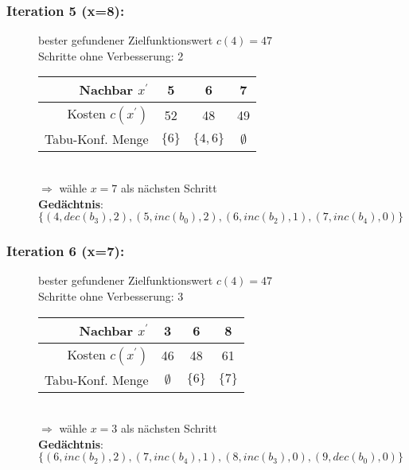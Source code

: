 \documentclass[12pt]{article}
\begin{document}
	\subsubsection*{Iteration 5 (x=8):}
	\begin{figure}[H]
		\centering
		bester gefundener Zielfunktionswert $c(4)=47$\\
		Schritte ohne Verbesserung: 2\\
		\begin{tabular}{r | ccc}
			Nachbar $x^\prime$   & 5 & 6 & 7\\\hline
			Kosten $c(x^\prime)$ & 52 & 48 & 49\\\hline
			Tabu-Konf. Menge     & $\{6\}$ & $\{4,6\}$ & $\emptyset$ \\
		\end{tabular}\\
		$\Rightarrow $ wähle $x=7$ als nächsten Schritt\\
		\textbf{Gedächtnis}: $\{(4, dec(b_3),2), (5, inc(b_0),2), (6, inc(b_2),1), (7,inc(b_4),0)\}$
	\end{figure}
	
	\subsubsection*{Iteration 6 (x=7):}
	\begin{figure}[H]
		\centering
		bester gefundener Zielfunktionswert $c(4)=47$\\
		Schritte ohne Verbesserung: 3\\
		\begin{tabular}{r | ccc}
			Nachbar $x^\prime$   & 3 & 6 & 8\\\hline
			Kosten $c(x^\prime)$ & 46 & 48 & 61\\\hline
			Tabu-Konf. Menge     & $\emptyset$ & $\{6\}$ & $\{7\}$\\
		\end{tabular}\\
		$\Rightarrow $ wähle $x=3$ als nächsten Schritt\\
		\textbf{Gedächtnis}: $\{(6, inc(b_2),2), (7,inc(b_4),1), (8, inc(b_3),0), (9, dec(b_0),0)\}$
	\end{figure}
\end{document}

